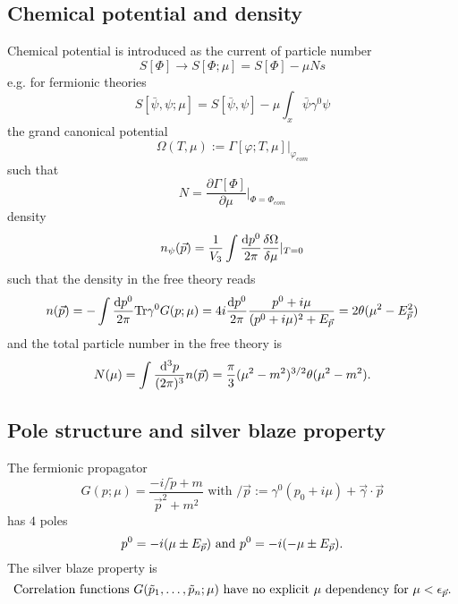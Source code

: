 \subsection{Chemical potential and density}
\begin{mybox}{}
	Chemical potential is introduced as the current of particle number
	\begin{equation}
	S[\Phi] \rightarrow S[\Phi;\mu] = S[\Phi] - \mu Ns
	\end{equation}
	e.g. for fermionic theories
	\begin{equation}
		S[\bar{\psi},\psi;\mu] = S[\bar{\psi},\psi] - \mu \int_x \bar{\psi}\gamma^0 \psi
	\end{equation}
	the grand canonical potential
	\begin{equation}
		\Omega (T,\mu) := \Gamma[\varphi;T,\mu] |_{\varphi_{eom}}
	\end{equation}
	such that 
	\begin{equation}
		N= \frac{\partial \Gamma[\Phi]}{\partial \mu} |_{\Phi=\Phi_{eom}}
	\end{equation}
	density
	\begin{equation}
		n_\psi(\vec{p}) = \frac{1}{V_3} \int \frac{\mathrm{d} p^0}{2 \pi} \frac{\delta \Omega}{\delta \mu} |_{T=0}
	\end{equation}
	such that the density in the free theory reads
	\begin{equation}
		n(\vec{p}) = - \int \frac{\mathrm{d} p^0}{2 \pi} \mathrm{Tr} \gamma^0 G(p;\mu) = 4i \frac{\mathrm{d} p^0}{2 \pi} \frac{p^0+i \mu}{(p^0+i\mu)^2+E_{\vec{p}}} = 2 \theta(\mu^2-E^2_{\vec{p}})
	\end{equation}
	and the total particle number in the free theory is
	\begin{equation}
		N(\mu) = \int \frac{\mathrm{d}^3 p}{(2 \pi)^3} n(\vec{p}) = \frac{\pi}{3} (\mu^2-m^2)^{3/2} \theta(\mu^2-m^2).
	\end{equation}
\end{mybox}

\subsection{Pole structure and silver blaze property}
\begin{mybox}{}
	The fermionic propagator
	\begin{equation}
		G(p;\mu) = \frac{-i \slash{\tilde{p}} +m}{\vec{p}^2+m^2} \text{ with } \slash{\vec{p}} := \gamma^0 (p_0 +i \mu) + \vec{\gamma} \cdot \vec{p}
	\end{equation}
	has $4$ poles
	\begin{equation}
		p^0 = -i (\mu \pm E_{\vec{p}}) \text{ and } p^0 = - i (-\mu \pm E_{\vec{p}}).
	\end{equation}
	The silver blaze property is
	\begin{equation}
		\text{Correlation functions } G(\tilde{p}_1,\dots,\tilde{p}_n;\mu) \text{ have no explicit } \mu \text{ dependency for } \mu < \epsilon_{\vec{p}}.
	\end{equation}

\end{mybox}


